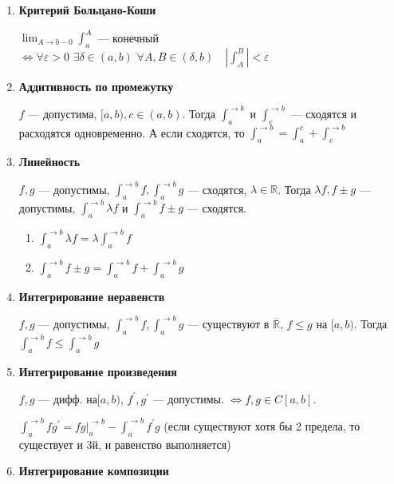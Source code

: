 \documentclass{article}
\def\dbl{\,\,}
\begin{document}
\begin{enumerate}
    \item \textbf{Критерий Больцано-Коши}
    
    $\lim_{A \rightarrow b - 0}{\int_a^A}$ --- конечный $\Leftrightarrow \forall \varepsilon > 0 \dbl \exists \delta \in (a, b) \dbl \forall A, B \in (\delta, b) \quad \left|\int_A^B\right| < \varepsilon$
    
  \item \textbf{Аддитивность по промежутку}
    
    $f$ --- допустима, $[a, b), c \in (a, b)$. Тогда $\int_a^{\rightarrow b}$ и $\int_c^{\rightarrow b}$ --- сходятся и расходятся одновременно. А если сходятся, то $\int_a^{\rightarrow b} = \int_a^{c} + \int_c^{\rightarrow b}$
    
  \item \textbf{Линейность}
    
    $f, g$ --- допустимы, $\int_a^{\rightarrow b}f, \int_a^{\rightarrow b}g$ --- сходятся, $\lambda \in \mathbb{R}$. Тогда $\lambda f, f \pm g$ --- допустимы, $\int_a^{\rightarrow b}{\lambda f}$ и $\int_a^{\rightarrow b}{f \pm g}$ --- сходятся. 
    
    \begin{enumerate}
        \item $\int_a^{\rightarrow b}{\lambda f} = \lambda \int_a^{\rightarrow b}{f}$
        
         \item $\int_a^{\rightarrow b}{f \pm g} = \int_a^{\rightarrow b}{f} + \int_a^{\rightarrow b}{g}$
    \end{enumerate}
    \item \textbf{Интегрирование неравенств}
    
    $f, g$ --- допустимы, $\int_a^{\rightarrow b}f, \int_a^{\rightarrow b}g$ --- существуют в $\overline{\mathbb{R}}$, $f \le g$ на $[a, b)$. Тогда $\int_a^{\rightarrow b}f \le \int_a^{\rightarrow b}g$
    
    \item \textbf{Интегрирование произведения}
    
    $f, g$ --- дифф. на$[a, b)$, $f^\prime, g^\prime $ --- допустимы. $\Leftrightarrow f, g \in C[a, b]$.
    
    $\int_a^{\rightarrow b}{fg^\prime} = fg|_a^{\rightarrow b} - \int_a^{\rightarrow b}{f^\prime g}$ (если существуют хотя бы 2 предела, то существует и 3й, и равенство выполняется)
    
    \item \textbf{Интегрирование композиции}
    

\end{enumerate}
\end{document}

